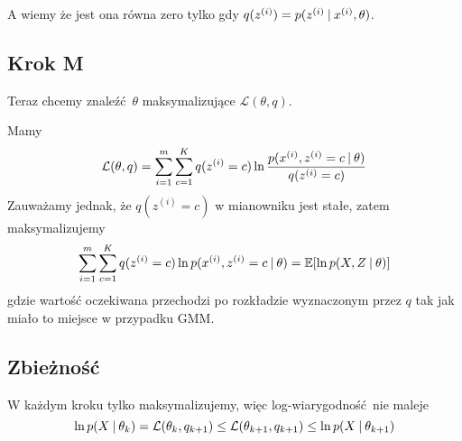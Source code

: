 A wiemy że jest ona równa zero tylko gdy \( q(z^{(i)}) = p(z^{(i)} \:\vert\: x^{(i)}, \theta) \).

\subsection{Krok M}

Teraz chcemy znaleźć \( \theta \) maksymalizujące \( \mathcal{L}(\theta, q) \).

Mamy
\[
	\mathcal{L}(\theta, q) = \sum_{i=1}^m \sum_{c=1}^K q(z^{(i)} = c) \ln \frac{p(x^{(i)}, z^{(i)} = c \:\vert\: \theta)}{q(z^{(i)}=c)}
\]
Zauważamy jednak, że \( q(z^{(i)}=c) \) w mianowniku jest stałe, zatem maksymalizujemy
\[
	\sum_{i=1}^m \sum_{c=1}^K q(z^{(i)} = c) \ln p(x^{(i)}, z^{(i)} = c \given \theta) = \expected{\ln p(X, Z \given \theta)}
\]
gdzie wartość oczekiwana przechodzi po rozkładzie wyznaczonym przez \( q \) tak jak miało to miejsce w przypadku GMM.

\subsection{Zbieżność}

W każdym kroku tylko maksymalizujemy, więc log-wiarygodność nie maleje
\[
	\ln p(X \:\vert\: \theta_k) = \mathcal{L}(\theta_k, q_{k + 1}) \leq \mathcal{L}(\theta_{k+1}, q_{k+1}) \leq \ln p(X \:\vert\: \theta_{k + 1})
\]